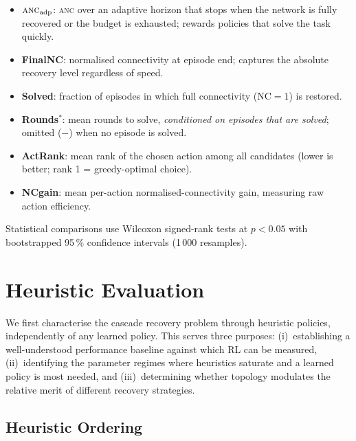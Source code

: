 \documentclass[11pt]{article}
\newcommand{\anc}{\textsc{anc}}
\newcommand{\ancadp}{\anc{}\textsubscript{adp}}
\begin{document}
\begin{itemize}
  \item $\ancadp$: \anc{} over an adaptive horizon that stops when the
        network is fully recovered or the budget is exhausted; rewards
        policies that solve the task quickly.
  \item \textbf{FinalNC}: normalised connectivity at episode end; captures
        the absolute recovery level regardless of speed.
  \item \textbf{Solved}: fraction of episodes in which full connectivity
        ($\mathrm{NC}=1$) is restored.
  \item \textbf{Rounds$^{*}$}: mean rounds to solve,
        \emph{conditioned on episodes that are solved}; omitted ($-$) when
        no episode is solved.
  \item \textbf{ActRank}: mean rank of the chosen action among all
        candidates (lower is better; rank 1 = greedy-optimal choice).
  \item \textbf{NCgain}: mean per-action normalised-connectivity gain,
        measuring raw action efficiency.
\end{itemize}

Statistical comparisons use Wilcoxon signed-rank tests \citep[p.\,75]{hollander2013nonparametric}
at $p < 0.05$ with bootstrapped 95\,\% confidence intervals
(1\,000 resamples).

\section{Heuristic Evaluation}
\label{sec:heuristics}

We first characterise the cascade recovery problem through heuristic
policies, independently of any learned policy.
This serves three purposes: (i)~establishing a well-understood performance
baseline against which RL can be measured, (ii)~identifying the parameter
regimes where heuristics saturate and a learned policy is most needed, and
(iii)~determining whether topology modulates the relative merit of different
recovery strategies.

\subsection{Heuristic Ordering}
\label{sec:ordering}
\end{document}
